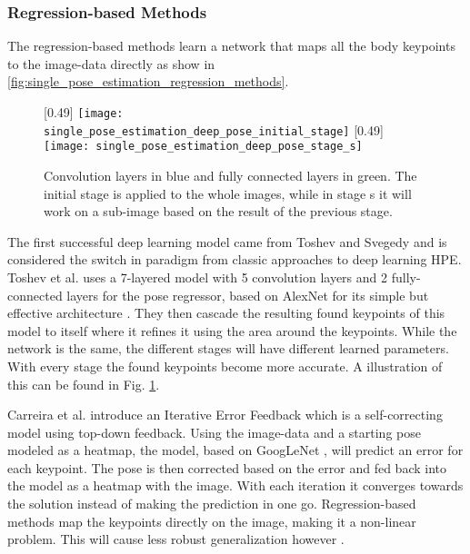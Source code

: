\subsubsection{Regression-based Methods}
The regression-based methods learn a network that maps all the body keypoints to the image-data directly as show in \ref{fig:single_pose_estimation_regression_methods}.

\begin{figure}
	\centering
	[0.49\textwidth]{%
		\texttt{[image: single\_pose\_estimation\_deep\_pose\_initial\_stage]}%
	}
	[0.49\textwidth]{%
		\texttt{[image: single\_pose\_estimation\_deep\_pose\_stage\_s]}%
	}
	\caption{
		Convolution layers in blue and fully connected layers in green.
		The initial stage is applied to the whole images, while in stage s it will work on a sub-image based on the result of the previous stage.\cite{Toshev2014}
	}
	\label{fig:deep_pose}
\end{figure}

The first successful deep learning model came from Toshev and Svegedy \cite{Toshev2014} and is considered the switch in paradigm from classic approaches to deep learning \gls{HPE}.
Toshev et al. uses a 7-layered model with 5 convolution layers and 2 fully-connected layers for the pose regressor, based on AlexNet for its simple but effective architecture \cite{AlexNet}.
They then cascade the resulting found keypoints of this model to itself where it refines it using the area around the keypoints.
While the network is the same, the different stages will have different learned parameters.
With every stage the found keypoints become more accurate.
A illustration of this can be found in Fig. \ref{fig:deep_pose}.

Carreira et al. \cite{CarreiraAFM15} introduce an Iterative Error Feedback which is a self-correcting model using top-down feedback.
Using the image-data and a starting pose modeled as a heatmap, the model, based on GoogLeNet \cite{googlenet}, will predict an error for each keypoint.
The pose is then corrected based on the error and fed back into the model as a heatmap with the image.
With each iteration it converges towards the solution instead of making the prediction in one go.
Regression-based methods map the keypoints directly on the image, making it a non-linear problem.
This will cause less robust generalization however \cite{Liu2104}.

